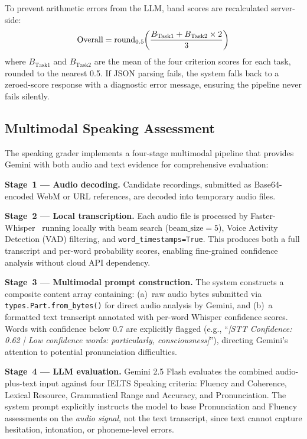 \documentclass{IEEEtran}
\begin{document}
To prevent arithmetic errors from the LLM, band scores are recalculated server-side:
\begin{equation}
\text{Overall} = \text{round}_{0.5}\negmedspace\left(\frac{B_{\text{Task1}} + B_{\text{Task2}} \times 2}{3}\right)
\label{eq:overall}
\end{equation}
where $B_{\text{Task1}}$ and $B_{\text{Task2}}$ are the mean of the four criterion scores for each task, rounded to the nearest 0.5. If JSON parsing fails, the system falls back to a zeroed-score response with a diagnostic error message, ensuring the pipeline never fails silently.

\subsection{Multimodal Speaking Assessment}

The speaking grader implements a four-stage multimodal pipeline that provides Gemini with both audio and text evidence for comprehensive evaluation:

\textbf{Stage~1 --- Audio decoding.} Candidate recordings, submitted as Base64-encoded WebM or URL references, are decoded into temporary audio files.

\textbf{Stage~2 --- Local transcription.} Each audio file is processed by Faster-Whisper~\cite{faster_whisper,whisper_paper} running locally with beam search ($\text{beam\_size}=5$), Voice Activity Detection (VAD) filtering, and \texttt{word\_timestamps=True}. This produces both a full transcript and per-word probability scores, enabling fine-grained confidence analysis without cloud API dependency.

\textbf{Stage~3 --- Multimodal prompt construction.} The system constructs a composite content array containing: (a)~raw audio bytes submitted via \texttt{types.Part.from\_bytes()} for direct audio analysis by Gemini, and (b)~a formatted text transcript annotated with per-word Whisper confidence scores. Words with confidence below 0.7 are explicitly flagged (e.g., ``\textit{[STT Confidence: 0.62 | Low confidence words: particularly, consciousness]}''), directing Gemini's attention to potential pronunciation difficulties.

\textbf{Stage~4 --- LLM evaluation.} Gemini 2.5 Flash evaluates the combined audio-plus-text input against four IELTS Speaking criteria: Fluency and Coherence, Lexical Resource, Grammatical Range and Accuracy, and Pronunciation. The system prompt explicitly instructs the model to base Pronunciation and Fluency assessments on the \emph{audio signal}, not the text transcript, since text cannot capture hesitation, intonation, or phoneme-level errors.
\end{document}
